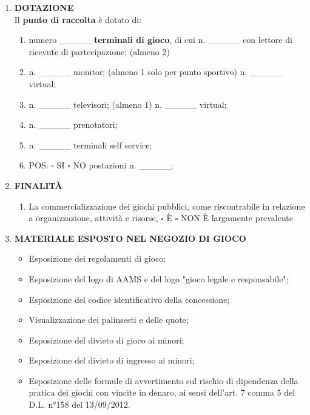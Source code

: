 \documentclass[12pt]{article}
\begin{document}
\begin{enumerate}[label={}]
    \item \textbf{DOTAZIONE}\\
        Il \textbf{punto di raccolta} è dotato di:
        \begin{enumerate}
            \item numero \_\_\_\_\_ \textbf{terminali di gioco}, di cui n. \_\_\_\_\_ con lettore di ricevute di partecipazione; (almeno 2)
            \item n. \_\_\_\_\_ monitor; (almeno 1 solo per punto sportivo) n. \_\_\_\_\_ virtual;
            \item n. \_\_\_\_\_ televisori; (almeno 1) n. \_\_\_\_\_ virtual;
            \item n. \_\_\_\_\_ prenotatori;
            \item n. \_\_\_\_\_ terminali self service;
            \item POS:
                \begin{math}\square\end{math} SI
                \begin{math}\square\end{math} NO
                 postazioni n. \_\_\_\_\_;
        \end{enumerate}
        \item \textbf{FINALITÀ}
        \begin{enumerate}
            \item La commercializzazione dei giochi pubblici, come riscontrabile in relazione a organizzazione, attività e risorse,
            \begin{math}\square\end{math} È \begin{math}\square\end{math} NON È largamente prevalente
        \end{enumerate}

        \item \textbf{MATERIALE ESPOSTO NEL NEGOZIO DI GIOCO}
        \begin{itemize}[label={\begin{math}\square\end{math}}]
            \item Esposizione dei regolamenti di gioco;
            \item Esposizione del logo di AAMS e del logo "gioco legale e responsabile";
            \item Esposizione del codice identificativo della concessione;
            \item Visualizzazione dei palinsesti e delle quote;
            \item Esposizione del divieto di gioco ai minori;
            \item Esposizione del divieto di ingresso ai minori;
            \item Esposizione delle formule di avvertimento sul rischio di dipendenza della pratica dei giochi con vincite in denaro, ai sensi dell'art. 7 comma 5 del D.L. n°158 del 13/09/2012.
        \end{itemize}


\end{enumerate}
\end{document}
